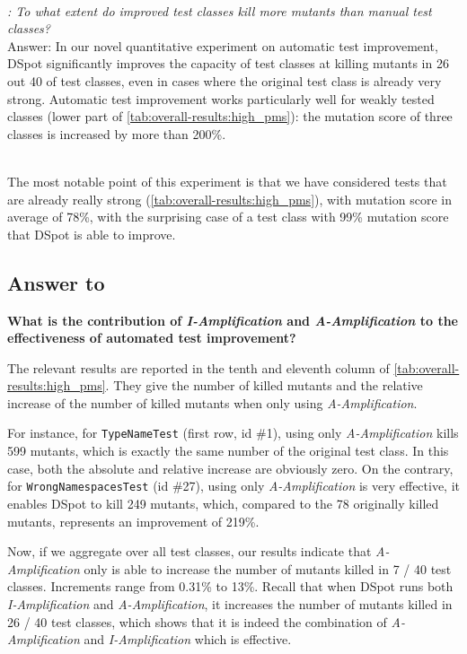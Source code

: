 \documentclass[table,xcdraw,smallextended]{svjour3}
\newcommand{\Iampl}{\emph{I-Amplification}\xspace}
\newcommand{\Aampl}{\emph{A-Amplification}\xspace}
\newcommand{\dspot}{DSpot\xspace}
\newcommand{\ms}{mutation score\xspace}
\newcommand{\ams}{number of killed mutants\xspace}
\begin{document}
~\\
\begin{mdframed}
\textit{\rqeffectiveness: To what extent do improved  test classes kill more mutants than manual test classes?}\\
Answer: In our novel quantitative experiment on automatic test improvement, \dspot significantly improves the capacity of test classes at killing mutants in 26 out 40 of test classes, even in cases where the original test class is already very strong. 
Automatic test improvement works particularly well for weakly tested classes (lower part of \autoref{tab:overall-results:high_pms}): the \ms of three classes is increased by more than 200\%.
\end{mdframed}
~\\
The most notable point of this experiment is that we have considered tests that are already really strong (\autoref{tab:overall-results:high_pms}), with \ms in average of 78\%, with the surprising case of a test class with 99\% \ms that \dspot is able to improve. 


\subsection{Answer to \rqAmplVersusIAmpl}

\textbf{What is the contribution of \Iampl{} and \Aampl{} to the effectiveness of automated test improvement?}

The relevant results are reported in the tenth and eleventh column of \autoref{tab:overall-results:high_pms}. %
They give the \ams and the relative increase of the number of killed mutants when only using \Aampl.

For instance, for \texttt{TypeNameTest} (first row, id \#1), using only \Aampl kills 599 mutants, which is exactly the same number of the original test class. In this case, both the absolute and relative increase are obviously zero.
On the contrary, for \texttt{WrongNamespacesTest} (id \#27), using only \Aampl  is very effective, it enables \dspot to kill 249 mutants, which, compared to the 78 originally killed mutants, represents an improvement of 219\%. 

Now, if we aggregate over all test classes, our results indicate that \Aampl only is able to increase the number of mutants killed in 7 / 40 test classes. Increments range from 0.31\% to 13\%. 
Recall that when \dspot runs both \Iampl{} and \Aampl, it increases the number of mutants killed in 26 / 40 test classes, which shows that it is indeed the combination of \Aampl and \Iampl which is effective.
\end{document}
